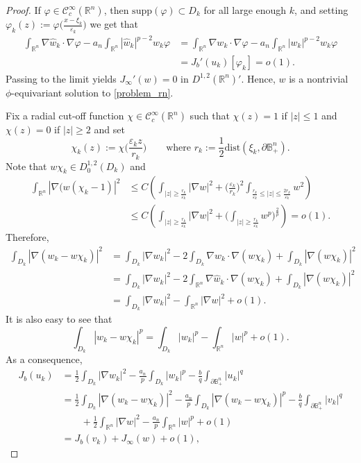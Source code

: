 \documentclass[10pt,a4paper]{amsart}
\def\D{\mathbb{B}^n_+}
\def\cC{\mathcal{C}}
\def\dist{\mathrm{dist}}
\def\eps{\varepsilon}
\def\irn{\int_{\rn}}
\def\rn{\mathbb{R}^n}
\def\supp{\mathrm{supp}}
\def\vp{\varphi}
\def\what{\widehat}
\begin{document}
\begin{proof}
If $\vp\in\cC^\infty_c(\rn)$, then $\supp(\vp)\subset D_k$ for all large enough $k$, and setting $\vp_k(z):=\vp\big(\frac{x-\xi_k}{\eps_k}\big)$ we get that
\begin{align*}
\irn\nabla\what w_k\cdot\nabla\vp-a_n\irn|\what w_k|^{p-2}w_k\vp &=\irn\nabla w_k\cdot\nabla\vp-a_n\irn|w_k|^{p-2}w_k\vp \\
& = J_b'(u_k)[\vp_k]=o(1).
\end{align*}
Passing to the limit yields $J_\infty'(w)=0$ in $D^{1,2}(\rn)'$. Hence, $w$ is a nontrivial $\phi$-equivariant solution to \eqref{problem_rn}. 

Fix a radial cut-off function $\chi\in\cC_c^\infty(\rn)$ such that $\chi(z)=1$ if $|z|\leq 1$ and $\chi(z)=0$ if $|z|\geq 2$ and set
$$\chi_k(z):=\chi\Big(\frac{\eps_k z}{r_k}\Big)\qquad\text{where \ }r_k:=\frac{1}{2}\dist(\xi_k,\partial\D).$$
Note that $w\chi_k\in D^{1,2}_0(D_k)$ and
\begin{align*}
\irn|\nabla(w(\chi_k-1)|^2 &\leq C\left(\int_{|z|\geq\frac{r_k}{\eps_k}}|\nabla w|^2 + \Big(\frac{\eps_k}{r_k}\Big)^2\int_{\frac{r_k}{\eps_k}\leq|z|\leq\frac{2r_k}{\eps_k}}w^2\right) \\
&\leq C\left(\int_{|z|\geq\frac{r_k}{\eps_k}}|\nabla w|^2 + \Big(\int_{|z|\geq\frac{r_k}{\eps_k}}w^p\Big)^\frac{2}{p}\right) = o(1).
\end{align*}
Therefore,
\begin{align*}
\int_{D_k}|\nabla(w_k-w\chi_k)|^2 &=\int_{D_k}|\nabla w_k|^2 - 2\int_{D_k}\nabla w_k\cdot\nabla(w\chi_k) + \int_{D_k}|\nabla(w\chi_k)|^2  \\
&=\int_{D_k}|\nabla w_k|^2 - 2\irn\nabla \what w_k\cdot\nabla(w\chi_k) + \int_{D_k}|\nabla(w\chi_k)|^2  \\
&=\int_{D_k}|\nabla w_k|^2 - \irn|\nabla w|^2 + o(1).
\end{align*}
It is also easy to see that
$$\int_{D_k}|w_k-w\chi_k|^p = \int_{D_k}|w_k|^p - \irn|w|^p + o(1).$$
As a consequence,
\begin{align}\label{eq:J(v)}
J_b(u_k)&=\frac{1}{2}\int_{D_k}|\nabla w_k|^2-\frac{a_n}{p}\int_{D_k}|w_k|^p - \frac{b}{q}\int_{\partial\D}|u_k|^q \nonumber \\
&=\frac{1}{2}\int_{D_k}|\nabla(w_k-w\chi_k)|^2-\frac{a_n}{p}\int_{D_k}|\nabla(w_k-w\chi_k)|^p - \frac{b}{q}\int_{\partial\D}|v_k|^q \nonumber\\
&\qquad+ \frac{1}{2}\irn|\nabla w|^2-\frac{a_n}{p}\irn|w|^p + o(1) \nonumber\\
&=J_b(v_k) + J_\infty(w) + o(1),
\end{align}

\end{proof}
\end{document}
